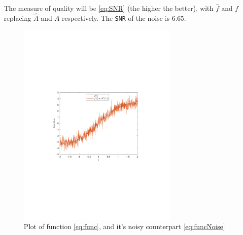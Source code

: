 \documentclass[a4paper]{article}
\begin{document}
	The measure of quality will be  \cref{eq:SNR} (the higher the better), with $\hat{f}$ and $f$ replacing $\hat{A}$ and $A$ respectively. The \texttt{SNR} of the noise is 6.65.

    \begin{figure}[H]
	\centering
	\includegraphics[trim={3.5cm 8cm 4cm 9cm},clip,width=0.7\textwidth]{Images/FuncNoisy.pdf}
	\caption{Plot of function \cref{eq:func}, and it's noisy counterpart \cref{eq:funcNoise}}
	\label{fig:FuncNoisy}
	\end{figure}
\end{document}
